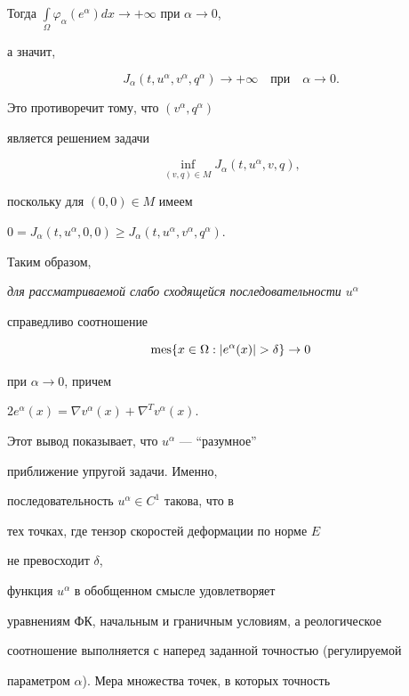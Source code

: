 Тогда $\int \limits_{\Omega}\varphi_{\alpha}(e^{\alpha}) dx


\to  +\infty$ при $\alpha \to 0$,


а значит,


$$


J_{\alpha}(t,u^{\alpha},v^{\alpha},q^{\alpha}) \to +\infty


\quad \text{при} \quad \alpha  \to 0.


$$


Это противоречит тому,  что $(v^{\alpha},q^{\alpha})$


является решением задачи


$$


\inf_{(v,q)\in M} J_{\alpha}(t,u^{\alpha},v,q),


$$


поскольку    для     $(0,0) \in M$ имеем


$0 =J_{\alpha}(t,u^{\alpha},0,0) \ge


J_{\alpha}(t,u^{\alpha},v^{\alpha},q^{\alpha})$.


Таким образом,


{\it для рассматриваемой слабо сходящейся  последовательности ${u^{\alpha}}$


справедливо соотношение}


$$


\mes \{ x\in \Omega : |e^{\alpha}(x)| > \delta\} \to 0


$$


при $\alpha \to 0$, причем


$2e^\alpha(x)=\nabla v^\alpha(x)+\nabla^T v^\alpha(x)$.





Этот вывод показывает, что  $u^{\alpha}$ --- ``разумное''


приближение упругой задачи. Именно,


последовательность $u^{\alpha} \in C^{1}$ такова, что в


тех  точках,  где тензор скоростей деформации по норме $E$


не превосходит $\delta$,


функция $u^{\alpha}$ в  обобщенном  смысле  удовлетворяет


уравнениям   ФК,  начальным  и  граничным  условиям,  а  реологическое


соотношение выполняется с  наперед  заданной  точностью  (регулируемой


параметром  $\alpha$).  Мера  множества точек,  в которых точность


